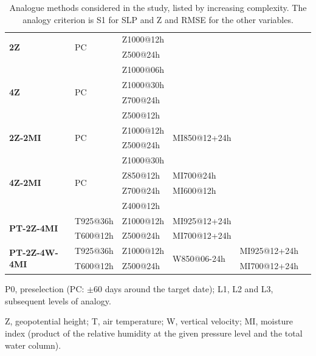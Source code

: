 \documentclass[alpha-refs]{wiley-article}
\begin{document}
\begin{table}[t]
	\caption{Analogue methods considered in the study, listed by increasing complexity. The analogy criterion is S1 for SLP and Z and RMSE for the other variables.}
	\small
	\begin{threeparttable}
	\begin{tabular}{llllll}
		\hline
		\headrow
		\thead{Method} & \thead{P0} & \thead{L1} & \thead{L2} & \thead{L3} & \thead{Reference} \\ 
		\hline 
		\multirow{2}{*}{\textbf{2Z}} & \multirow{2}{*}{PC} & Z1000@12h &&& \multirow{2}{*}{\citealp{Bontron2004}} \\
		&& Z500@24h &&& \\
		\hline 
		\multirow{4}{*}{\textbf{4Z}} & \multirow{4}{*}{PC} & Z1000@06h &&& \multirow{4}{*}{\citealp{Horton2018a}} \\
		&& Z1000@30h &&& \\
		&& Z700@24h &&& \\
		&& Z500@12h &&& \\
		\hline 
		\multirow{2}{*}{\textbf{2Z-2MI}} & \multirow{2}{*}{PC} & Z1000@12h & \multirow{2}{*}{MI850@12+24h} && \multirow{2}{*}{\citealp{Bontron2004}} \\
		&& Z500@24h &&& \\
		\hline 
		\multirow{4}{*}{\textbf{4Z-2MI}} & \multirow{4}{*}{PC} & Z1000@30h &&& \multirow{4}{*}{\citealp{Horton2018a}}\\
		&& Z850@12h & MI700@24h && \\
		&& Z700@24h & MI600@12h && \\
		&& Z400@12h &&& \\
		\hline 
		\multirow{2}{*}{\textbf{PT-2Z-4MI}} & T925@36h & Z1000@12h & MI925@12+24h && \multirow{2}{*}{\citealp{BenDaoud2016}} \\
		& T600@12h & Z500@24h & MI700@12+24h && \\
		\hline 
		\multirow{2}{*}{\textbf{PT-2Z-4W-4MI}} & T925@36h & Z1000@12h & \multirow{2}{*}{W850@06-24h} & MI925@12+24h & \multirow{2}{*}{\citealp{BenDaoud2016}} \\
		& T600@12h & Z500@24h && MI700@12+24h & \\
		\hline 
	\end{tabular} 

	\begin{tablenotes}
	\item P0, preselection (PC: $\pm 60$ days around the target date); L1, L2 and L3, subsequent levels of analogy.
	\item Z, geopotential height; T, air temperature; W, vertical velocity; MI, moisture index (product of the relative humidity at the given pressure level and the total water column).
	\end{tablenotes}
	\end{threeparttable}
	\label{table:methods}
\end{table}
\end{document}
